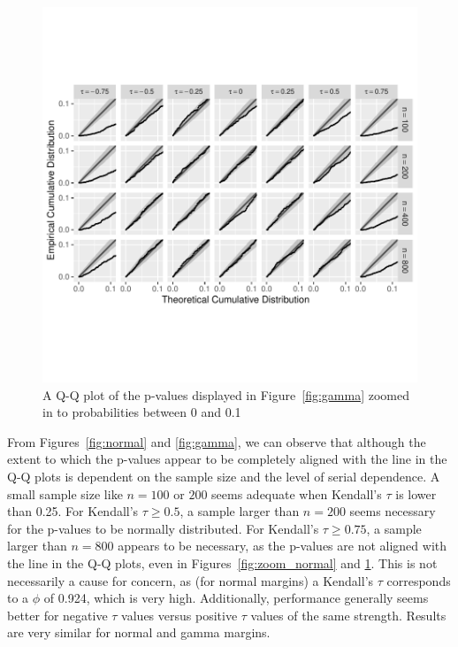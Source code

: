 \documentclass[12pt, titlepage, letterpaper]{article}
\begin{document}
{\begin{figure}[tbp]
  \centering
  \includegraphics[scale=1]{figures/zoom_gamma}
  \caption{A Q-Q plot of the p-values displayed in Figure~\ref{fig:gamma} zoomed in to 
  probabilities between 0 and
  0.1}
  \label{fig:zoom_gamma}
\end{figure}

From Figures~\ref{fig:normal} and \ref{fig:gamma}, we can observe that 
although the extent to which the p-values appear to be 
completely aligned with the line
in the Q-Q plots is dependent on the sample size and the level of serial 
dependence.
A small sample size like $n = 100$ or $200$ seems adequate when Kendall's
$\tau$ is lower than 0.25. For Kendall's $\tau \geq 0.5$, a sample larger than
$n = 200$ seems necessary for the p-values to be normally distributed. For
Kendall's $\tau \geq 0.75$, a sample larger than $n = 800$ appears to be 
necessary, as the p-values are not aligned with the line in the Q-Q plots, even
in Figures~\ref{fig:zoom_normal} and \ref{fig:zoom_gamma}. This
is not necessarily a cause for concern, as (for normal margins)
a Kendall's $\tau$ corresponds to
a $\phi$ of 0.924, which is very high. Additionally, performance generally seems
better for negative $\tau$ values versus positive $\tau$ values of the same
strength. Results are very similar for normal and gamma margins.


}
\end{document}
